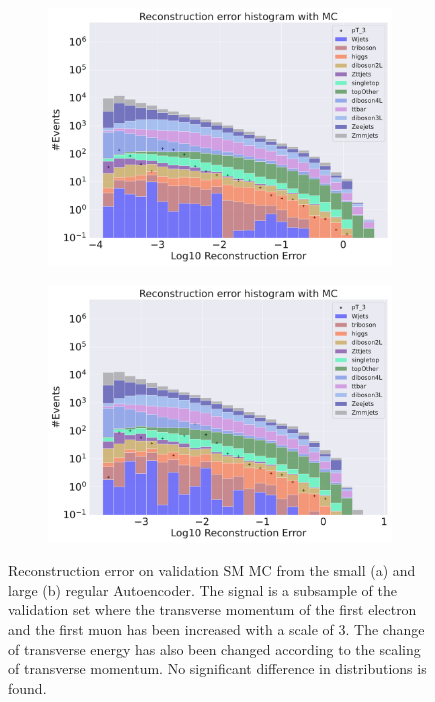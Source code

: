 \begin{figure}[H]
    \centering
    \begin{subfigure}{.45\textwidth}
        \includegraphics[width=\textwidth]{Figures/AE_testing/small/b_data_recon_big_rm3_feats_sig_pT_3.pdf}
        \caption{}
        \label{fig:ae_small_pt_3}
    \end{subfigure}
    \hfill 
    \begin{subfigure}{.45\textwidth}
        \includegraphics[width=\textwidth]{Figures/AE_testing/big/b_data_recon_big_rm3_feats_sig_pT_3.pdf}
        \caption{}
        \label{fig:ae_big_pt_3}
    \end{subfigure}
    \hfill 
    \caption[AE | Reconstruction error $p_T$ altering of 3]{Reconstruction error on validation SM MC from the small (a) and large (b) regular Autoencoder. The signal is a subsample of the validation 
    set where the transverse momentum of the first electron and the first muon has been increased with a scale of $3$. The change of transverse 
    energy has also been changed according to the scaling of transverse momentum. No significant difference in distributions is found.  }
    \label{fig:ae_big_small_pt_3}
\end{figure}

